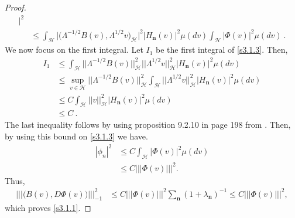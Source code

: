 \documentclass[review,onefignum,onetabnum]{siamart190516}
\begin{document}
\begin{proof}
\begin{equation}
\begin{aligned}
            \Bigg|^2
            \\
            &\le
            \int_{\mathcal{H}}
            \big|
                \big(
                    \Lambda^{-1/2}B(v),\Lambda^{1/2} v
                \big)_{\mathcal{H}}
            \big|^2
            \big|
                H_{\mathbf{n}}(v)
            \big|^2 \mu(dv)
            \int_{\mathcal{H}}
            \big|
                \Phi(v)
            \big|^2  \mu(dv)
            \ .
     \end{aligned}
\end{equation}
We now focus on the first integral. Let $I_1$ be the first integral of
\eqref{s3.1.3}. Then,
\begin{align*}
    I_1
        &
            \le \int_{\mathcal{H}} \big| \big| \Lambda^{-1/2} B(v)
            \big| \big|_{\mathcal{H}}^2
            \big| \big| 
                \Lambda^{1/2}v 
            \big|\big|_{\mathcal{H}}^2
            \big|H_{\mathbf{n}}(v)\big|^2 \mu(dv)
            \\
        &
            \le \sup_{v\in\mathcal{H}} 
            \big|\big|\Lambda^{-1/2}B(v)
            \big|\big|_{\mathcal{H}}^2
            \int_{\mathcal{H}} 
            \big|\big|
                \Lambda^{1/2}v 
            \big|\big|_{\mathcal{H}}^2
            \big|H_{\mathbf{n}}(v)\big|^2 \mu(dv)
            \\
        & 
            \le C \int_{\mathcal{H}} 
            \big|\big| v \big|\big|_{\mathcal{H}}^2
            \big|H_{\mathbf{n}}(v)\big|^2 \mu(dv)
        \\
        & 
            \le C \ .
\end{align*}
%
The last inequality follows by using proposition 9.2.10 in page 198 from
\cite{da-za1}. Then, by using this bound on \eqref{s3.1.3} we have.
\begin{align*}
    | \phi_n |^2 &\le C \int_{\mathcal{H}}\big|  \Phi(v)\big|^2  \mu(dv)\\
    &\le C |||\Phi(v) |||^2  .
\end{align*}
Thus,
\begin{align*}
    ||| \big(B(v),D\Phi(v) \big) |||_{-1}^2 
        &\le C |||\Phi(v) |||^2
        \sum_{\mathbf{n}} (1+\lambda_{\mathbf{n}})^{-1}  
        \le C |||\Phi(v) |||^2 ,
\end{align*}
 which proves \eqref{s3.1.1}.


\end{proof}
\end{document}
